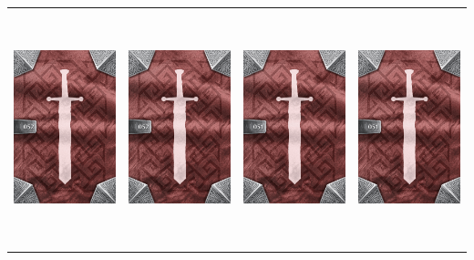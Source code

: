 \documentclass{minimal}
\begin{document}
{\begin{longtable}{llll}
\includegraphics[width=44mm,height=68mm]{./50-56/gh-052-protective-charm-back.png} &
\includegraphics[width=44mm,height=68mm]{./50-56/gh-052-protective-charm-back.png} &
\includegraphics[width=44mm,height=68mm]{./50-56/gh-051-shadow-armor-back.png} &
\includegraphics[width=44mm,height=68mm]{./50-56/gh-051-shadow-armor-back.png}\\ 

\end{longtable}}
\end{document}
